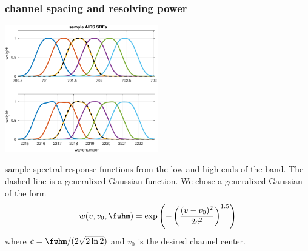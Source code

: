 \begin{frame} %
\frametitle{channel spacing and resolving power}

\includegraphics[width=0.5\textwidth]{figures/airs_sample_SRF.pdf}

sample {\airs} spectral response functions from the low and high
ends of the band.  The dashed line is a generalized Gaussian
function.  We chose a generalized Gaussian of the form
\[w(v, v_0, \fwhm) = 
\exp\left(-\left(\frac{(v - v_0)^2}{2c^2}\right)^{1.5}\right) \]
where $c=\fwhm / (2\sqrt{2\ln 2})$ and $v_0$ is the desired channel
center.  
\end{frame} %

